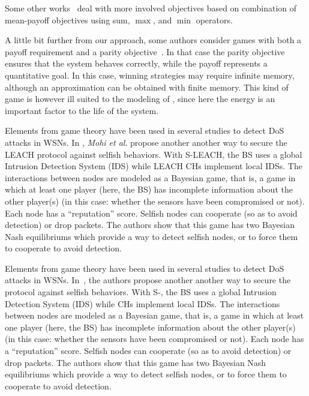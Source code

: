 Some other works~\cite{velner12b} deal with more involved objectives based on combination of mean-payoff objectives using sum, $\max$, and $\min$ operators.

\smallskip

A little bit further from our approach, some authors consider games with both a payoff requirement and a parity objective~\cite{chatterjee05}.
In that case the parity objective ensures that the system behaves correctly, while the payoff represents a quantitative goal.
In this case, winning strategies may require infinite memory, although an approximation can be obtained with finite memory.
This kind of game is however ill suited to the modeling of \wsn, since here the energy is an important factor to the life of the system.





Elements from game theory have been used in several studies to detect DoS attacks in WSNs.
In
\cite{MMZ09},
\textit{Mohi et al}. propose another another way to secure the LEACH protocol against selfish behaviors.
With S-LEACH, the BS uses a global Intrusion Detection System (IDS) while LEACH CHs implement local IDSs.
The interactions between nodes are modeled as a Bayesian game, that is, a game in which at least one player (here, the BS) has incomplete information about the other player(s) (in this case: whether the sensors have been compromised or not).
Each node has a ``reputation'' score.
Selfish nodes can cooperate (so as to avoid detection) or drop packets.
The authors show that this game has two Bayesian Nash equilibriums which provide a way to detect selfish nodes, or to force them to cooperate to avoid detection.




Elements from game theory have been used in several studies to detect DoS attacks in WSNs.
In~\cite{MMZ09}, the authors propose another another way to secure the \leach protocol against selfish behaviors.
With S-\leach, the BS uses a global Intrusion Detection System (IDS) while \leach CHs implement local IDSs.
The interactions between nodes are modeled as a Bayesian game, that is, a game in which at least one player (here, the BS) has incomplete information about the other player(s) (in this case: whether the sensors have been compromised or not).
Each node has a ``reputation'' score.
Selfish nodes can cooperate (so as to avoid detection) or drop packets.
The authors show that this game has two Bayesian Nash equilibriums which provide a way to detect selfish nodes, or to force them to cooperate to avoid detection.
